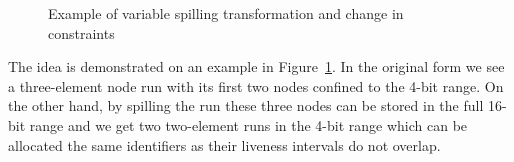 \documentclass[12pt,twoside,notitlepage]{report}
\begin{document}
\begin{figure}

	\caption{Example of variable spilling transformation and change in constraints}
	\label{figure:Reassembling_VariableSpilling}
\end{figure}

The idea is demonstrated on an example in Figure~\ref{figure:Reassembling_VariableSpilling}. In the original form we see a three-element node run with its first two nodes confined to the 4-bit range. On the other hand, by spilling the run these three nodes can be stored in the full 16-bit range and we get two two-element runs in the 4-bit range which can be allocated the same identifiers as their liveness intervals do not overlap.
\end{document}
